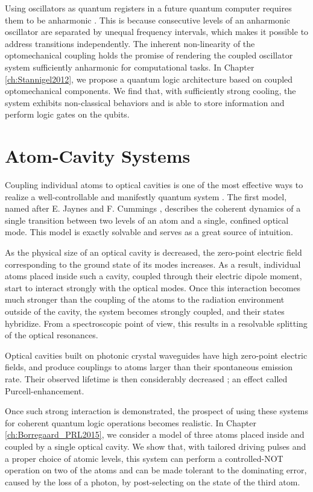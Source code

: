 Using oscillators as quantum registers in a future quantum computer requires
them to be anharmonic \cite{Majer2007}. This is because consecutive levels of an
anharmonic oscillator are separated by unequal frequency intervals, which makes
it possible to address transitions independently. The inherent
non-linearity of the optomechanical coupling holds the promise of rendering the
coupled oscillator system sufficiently anharmonic for computational tasks. In
Chapter \ref{ch:Stannigel2012}, we propose a quantum logic architecture based on
coupled optomechanical components. We find that, with sufficiently strong
cooling, the system exhibits non-classical behaviors and is able to store
information and perform logic gates on the qubits.






\section{Atom-Cavity Systems}
Coupling individual atoms to optical cavities is one of the most effective ways
to realize a well-controllable and manifestly quantum system \cite{Mabuchi2002,
Walther2006}.
The first model, named after E. Jaynes and F. Cummings \cite{Jaynes1963,
Shore1993}, describes the coherent dynamics of a single transition between two
levels of an atom and a single, confined optical mode. This model is exactly
solvable and serves as a great source of intuition.

As the physical size of an optical cavity is decreased, the zero-point
electric field corresponding to the ground state of its modes increases.
As a result, individual atoms placed inside such a cavity, coupled through their
electric dipole moment, start to interact strongly with the optical modes. Once
this interaction becomes much stronger than the coupling of the atoms to the
radiation environment outside of the cavity, the system becomes strongly coupled, and
their states hybridize. From a spectroscopic point of view, this results in a
resolvable splitting of the optical resonances.

Optical cavities built on photonic crystal waveguides \cite{Tiecke} have
high zero-point electric fields, and produce couplings
to atoms larger than their spontaneous emission rate. Their
observed lifetime is then considerably decreased \cite{Englund2005}; an effect
called Purcell-enhancement.

Once such strong interaction is demonstrated, the prospect of using these
systems for coherent quantum logic operations becomes realistic. In Chapter
\ref{ch:Borregaard_PRL2015}, we consider a model of three atoms placed inside
and coupled by a single optical cavity. We show that, with tailored driving pulses
and a proper choice of atomic levels, this system can perform a controlled-NOT
operation on two of the atoms and can be made tolerant to the dominating error,
caused by the loss of a photon, by post-selecting on the state of the third
atom.

